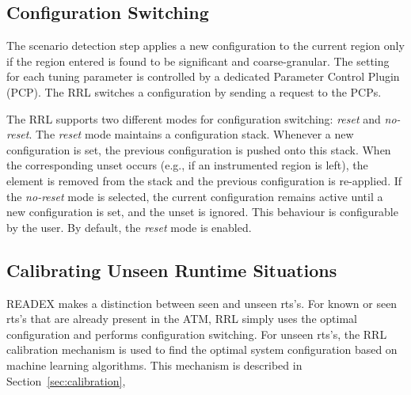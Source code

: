 \subsection{Configuration Switching}\label{config-switching}
The scenario detection step applies a new configuration to the current region only if the region entered is found to be significant and coarse-granular. The setting for each tuning parameter is controlled by a dedicated Parameter Control Plugin (PCP). The RRL switches a configuration by sending a request to the PCPs. 

The RRL supports two different modes for configuration switching: \textit{reset} and \textit{no-reset}. The \textit{reset} mode maintains a configuration stack. Whenever a new configuration is set, the previous configuration is pushed onto this stack. When the corresponding unset occurs (e.g., if an instrumented region is left), the element is removed from the stack and the previous configuration is re-applied. If the \textit{no-reset} mode is selected, the current configuration remains active until a new configuration is set, and the unset is ignored. This behaviour is configurable by the user. By default, the \textit{reset} mode is enabled.

\subsection{Calibrating Unseen Runtime Situations}\label{calibr}
READEX makes a distinction between seen and unseen rts's. For known or seen rts's that are already present in the ATM, RRL simply uses the optimal configuration and performs configuration switching. For unseen rts's, the RRL calibration mechanism is used to find the optimal system configuration based on machine learning algorithms. This mechanism is described in Section~\ref{sec:calibration},

 

 